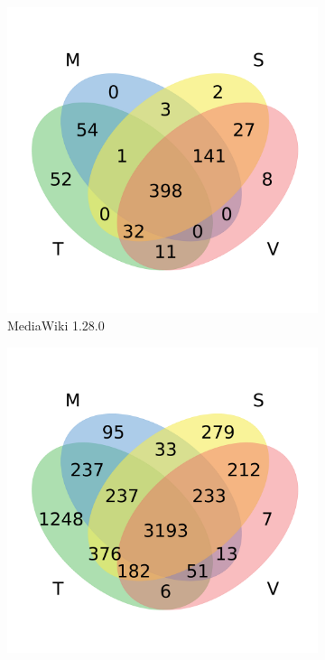 \begin{figure}[t]
\begin{subfigure}[b]{0.22\textwidth}
          \includegraphics[width=\textwidth]{figures/venn_mwk.pdf}
          \caption{\scriptsize{MediaWiki 1.28.0}}
          \label{fig:venn_mwk}
    \end{subfigure}
    \begin{subfigure}[b]{0.22\textwidth}
          \includegraphics[width=\textwidth]{figures/venn_mgt.pdf}

\end{subfigure}
\end{figure}
